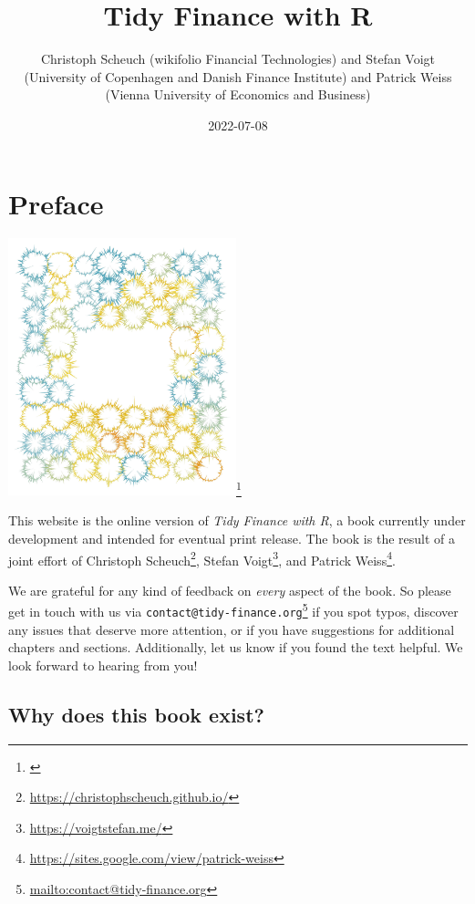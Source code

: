 \documentclass[
]{krantz}
\title{Tidy Finance with R}
\author{Christoph Scheuch (wikifolio Financial Technologies) and Stefan Voigt (University of Copenhagen and Danish Finance Institute) and Patrick Weiss (Vienna University of Economics and Business)}
\date{2022-07-08}
\renewcommand{\href}[2]{#2\footnote{\url{#1}}}
\begin{document}
\maketitle

\setlength{\abovedisplayskip}{-5pt}
\setlength{\abovedisplayshortskip}{-5pt}

\mainmatter

{
\setcounter{tocdepth}{2}
\tableofcontents
}
\hypertarget{preface}{%
\chapter*{Preface}\label{preface}}


\href{}{\includegraphics[width=2.60417in,height=\textheight]{cover.jpg}}

This website is the online version of \emph{Tidy Finance with R}, a book currently under development and intended for eventual print release. The book is the result of a joint effort of \href{https://christophscheuch.github.io/}{Christoph Scheuch}, \href{https://voigtstefan.me/}{Stefan Voigt}, and \href{https://sites.google.com/view/patrick-weiss}{Patrick Weiss}.

We are grateful for any kind of feedback on \emph{every} aspect of the book. So please get in touch with us via \href{mailto:contact@tidy-finance.org}{\nolinkurl{contact@tidy-finance.org}} if you spot typos, discover any issues that deserve more attention, or if you have suggestions for additional chapters and sections. Additionally, let us know if you found the text helpful. We look forward to hearing from you!

\hypertarget{why-does-this-book-exist}{%
\section*{Why does this book exist?}\label{why-does-this-book-exist}}
\end{document}
